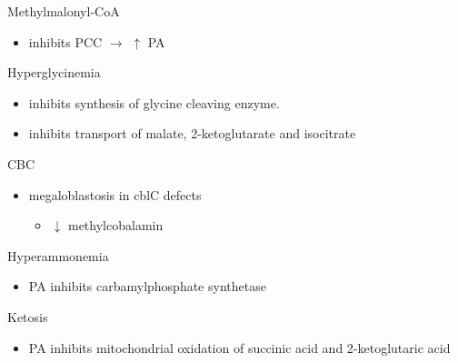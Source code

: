 \documentclass[presentation, smaller]{beamer}
\begin{document}
\begin{frame}[label={sec:orgheadline10}]{Methylmalonyl-CoA}
\begin{itemize}
\item inhibits PCC \(\to\) \(\uparrow\) PA
\end{itemize}
\begin{block}{Hyperglycinemia}
\begin{itemize}
\item inhibits synthesis of glycine cleaving enzyme.
\item inhibits transport of malate, 2-ketoglutarate and isocitrate
\end{itemize}
\end{block}
\begin{block}{CBC}
\begin{itemize}
\item megaloblastosis in cblC defects
\begin{itemize}
\item \(\downarrow\) methylcobalamin
\end{itemize}
\end{itemize}
\end{block}

\begin{block}{Hyperammonemia}
\begin{itemize}
\item PA inhibits carbamylphosphate synthetase
\end{itemize}
\end{block}
\begin{block}{Ketosis}
\begin{itemize}
\item PA inhibits mitochondrial oxidation of succinic acid and 2-ketoglutaric acid
\end{itemize}
\end{block}
\end{frame}
\end{document}
